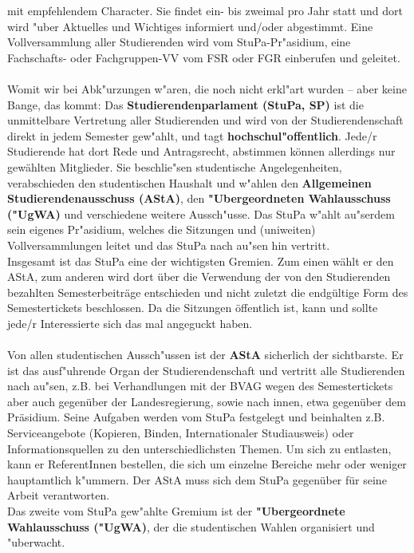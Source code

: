 mit empfehlendem Character. Sie findet ein- bis zweimal pro Jahr statt und
dort wird "uber Aktuelles und Wichtiges informiert und/oder abgestimmt. Eine
Vollversammlung aller Studierenden wird vom StuPa-Pr"asidium, eine 
Fachschafts- oder Fachgruppen-VV vom FSR oder FGR einberufen und geleitet.
\\\\
Womit wir bei Abk"urzungen w"aren, die noch nicht erkl"art wurden -- aber keine 
Bange, das kommt: Das \textbf{Studierendenparlament (StuPa, SP)} ist die 
unmittelbare Vertretung aller Studierenden und wird von der Studierendenschaft 
direkt in jedem Semester gew"ahlt, und tagt \textbf{hochschul"offentlich}.
Jede/r Studierende hat dort Rede und Antragsrecht, abstimmen können allerdings nur 
gewählten Mitglieder. Sie beschlie"sen studentische Angelegenheiten, verabschieden den studentischen 
Haushalt und w"ahlen den \textbf{Allgemeinen Studierendenausschuss (AStA)},
den \textbf{"Ubergeordneten Wahlausschuss ("UgWA)}
und verschiedene weitere Aussch"usse. Das StuPa w"ahlt au"serdem sein eigenes
Pr"asidium, welches die Sitzungen und (uniweiten) Vollversammlungen leitet und
das StuPa nach au"sen hin vertritt.  \\
Insgesamt ist das StuPa eine der wichtigsten Gremien. Zum einen wählt er den AStA, zum anderen 
wird dort über die Verwendung der von den Studierenden bezahlten Semesterbeiträge entschieden 
und nicht zuletzt die endgültige Form des Semestertickets beschlossen. 
Da die Sitzungen öffentlich ist, kann und sollte jede/r Interessierte sich das mal angeguckt haben.
\\\\

Von allen studentischen Aussch"ussen ist der \textbf{AStA} sicherlich der
sichtbarste. Er ist das ausf"uhrende Organ der 
Studierendenschaft und vertritt alle Studierenden nach au"sen, z.B. bei 
Verhandlungen mit der BVAG wegen des Semestertickets aber auch gegenüber der 
Landesregierung, sowie nach innen, etwa gegenüber dem Präsidium. Seine Aufgaben werden vom 
StuPa festgelegt und beinhalten z.B. Serviceangebote (Kopieren, Binden, 
Internationaler Studiausweis) oder Informationsquellen zu den 
unterschiedlichsten Themen. Um sich zu entlasten, kann er ReferentInnen 
bestellen, die sich um einzelne Bereiche mehr oder weniger hauptamtlich 
k"ummern.  
Der AStA muss sich dem StuPa gegenüber für seine Arbeit verantworten.\\
Das zweite vom StuPa gew"ahlte Gremium ist der \textbf{"Ubergeordnete 
Wahlausschuss ("UgWA)}, der die studentischen Wahlen organisiert und "uberwacht.
\\\\

